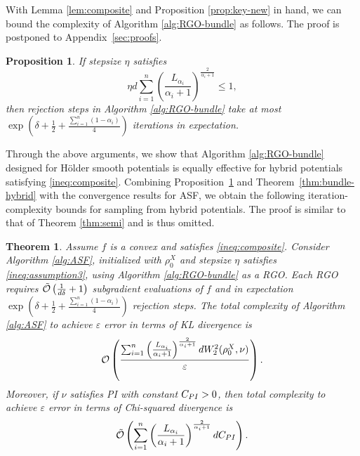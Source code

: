 \documentclass[11pt,letterpaper]{article}
\newcommand{\chen}{\color{cyan}}
\newtheorem{theorem}[thm]{Theorem}
\newtheorem{proposition}[thm]{Proposition}
\begin{document}
With Lemma \ref{lem:composite} and Proposition \ref{prop:key-new} in hand, we can bound the complexity of Algorithm \ref{alg:RGO-bundle} as follows.
The proof is postponed to Appendix~\ref{sec:proofs}.

\begin{proposition}\label{prop:composite}
If stepsize $\eta$ satisfies
\begin{equation}\label{ineq:assumption3}
    \eta d \sum_{i=1}^n \left(\frac{L_{\alpha_i}}{\alpha_i+1}\right)^{\frac{2}{\alpha_i+1}} \le 1,
\end{equation}
then rejection steps in Algorithm \ref{alg:RGO-bundle} take at most $\exp\left(\delta +\frac12 + \frac{\sum_{i=1}^n (1-\alpha_i)}{4}\right)$ iterations in expectation.
\end{proposition}

Through the above arguments, we show that Algorithm \ref{alg:RGO-bundle} designed for Hölder smooth potentials is equally effective for hybrid potentials satisfying \eqref{ineq:composite}. Combining Proposition~\ref{prop:composite} and Theorem~\ref{thm:bundle-hybrid} with the convergence results for ASF, we obtain the following iteration-complexity bounds for sampling from hybrid potentials. The proof is similar to that of Theorem \ref{thm:semi} and is thus omitted.

\begin{theorem}\label{thm:all}
Assume $f$ is a convex and satisfies \eqref{ineq:composite}. Consider Algorithm \ref{alg:ASF}, initialized with $\rho_0^X$ and stepsize $\eta$ satisfies \eqref{ineq:assumption3}, using Algorithm \ref{alg:RGO-bundle} as a RGO. Each RGO requires $\tilde {\cal O}\left(\frac{1}{d\delta} + 1\right)$ subgradient evaluations of $f$ and in expectation
$\exp\left(\delta +\frac12 + \frac{\sum_{i=1}^n (1-\alpha_i)}{4}\right)$ rejection steps.
The total complexity of Algorithm \ref{alg:ASF} to achieve $\varepsilon$ error in terms of KL divergence is 
    \[
        {\cal O}\left(\frac{\sum_{i=1}^n \left(\frac{L_{\alpha_i}}{\alpha_i+1}\right)^{\frac{2}{\alpha_i+1}} d W_2^2(\rho_0^X,\nu)}{\varepsilon}\right).
    \]
Moreover, if $\nu$ satisfies PI with constant $C_{\rm PI}>0$, then total complexity to achieve $\varepsilon$ error in terms of Chi-squared divergence is 
    \[
        \tilde{\cal O}\left(\sum_{i=1}^n \left(\frac{L_{\alpha_i}}{\alpha_i+1}\right)^{\frac{2}{\alpha_i+1}} d C_{\rm PI}\right).
    \]
\end{theorem}
\end{document}
